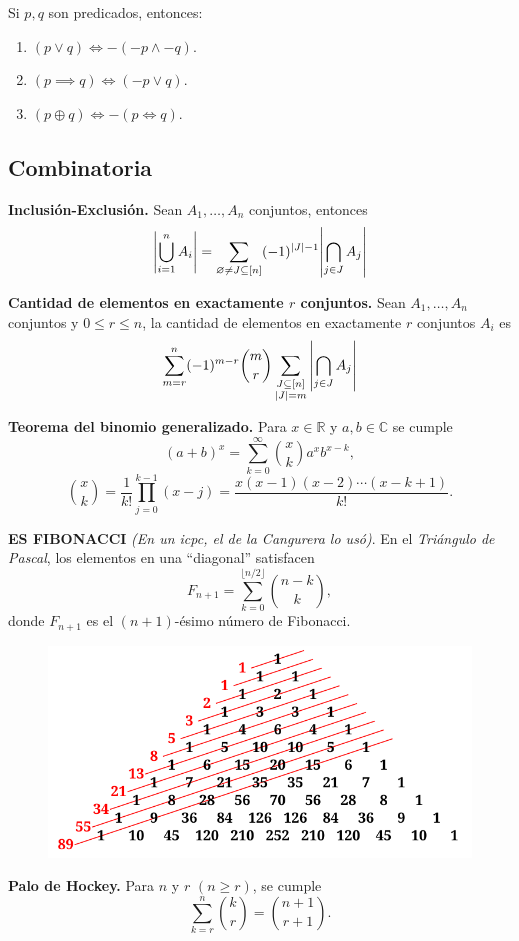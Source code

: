 \documentclass[10pt,spanish,mexico]{article}
\numberwithin{equation}{section}
\newcommand{\R}{\mathbb{R}}
\begin{document}
\begin{multicols}{2}
Si $p, q$ son predicados, entonces:
\begin{enumerate}[1.]
    \item $(p \vee q) \iff -(-p \wedge -q)$.
    \item $(p \implies q) \iff (-p \vee q)$.
    \item $(p \oplus q) \iff -(p \iff q)$.
\end{enumerate}

\subsection{Combinatoria}

\textbf{Inclusión-Exclusión.} Sean $A_1, \dots, A_n$ conjuntos, entonces
$$\abs{\bigcup_{i = 1}^n A_i} = \sum_{\varnothing \neq J \subseteq [n]} (-1)^{|J| - 1}\abs{\bigcap_{j \in J} A_j}$$

\textbf{Cantidad de elementos en exactamente $r$ conjuntos.} Sean $A_1, \dots, A_n$ conjuntos y $0 \leq r \leq n$, la cantidad de elementos en exactamente $r$ conjuntos $A_i$ es
$$\sum_{m = r}^n (-1)^{m - r}\binom{m}{r}\sum_{\substack{J \subseteq [n]\\|J| = m}} \abs{\bigcap_{j \in J} A_j}$$

\textbf{Teorema del binomio generalizado.} Para $x \in \R$ y $a, b \in \mathbb{C}$ se cumple
$$(a + b)^x = \sum_{k = 0}^\infty \binom{x}{k}a^{x}b^{x - k},$$
$$\binom{x}{k} = \frac{1}{k!}\prod_{j = 0}^{k - 1}(x - j) = \frac{x(x - 1)(x - 2)\cdots(x - k + 1)}{k!}.$$

\textbf{ES FIBONACCI} \textit{(En un icpc, el de la Cangurera lo usó)}. En el \textit{Triángulo de Pascal}, los elementos en una ``diagonal'' satisfacen
\[
F_{n+1} = \sum_{k=0}^{\lfloor n/2 \rfloor} \binom{n-k}{k},
\]
donde \( F_{n+1} \) es el \((n+1)\)-ésimo número de Fibonacci.

\begin{figure}[H]
    \centering
	\includegraphics[width=0.5\columnwidth]{img/FiboPascal.png}
\end{figure}

\textbf{Palo de Hockey.}
Para \( n \) y \( r \) \((n \geq r)\), se cumple
\[
\sum_{k=r}^{n} \binom{k}{r} = \binom{n+1}{r+1}.
\]


\end{multicols}
\end{document}
